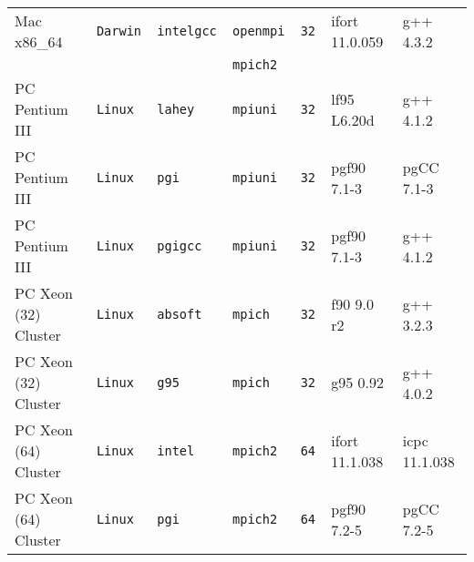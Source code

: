 \begin{tabular}{lllllll}
Mac x86\_64           &\tt Darwin &\tt intelgcc     &\tt openmpi    &\tt 32              & ifort \footnotesize 11.0.059       & g++ \footnotesize 4.3.2         \\
                      &           &                 &\tt mpich2     &                    &                                    &                                 \\
PC Pentium III        &\tt Linux  &\tt lahey        &\tt mpiuni     &\tt 32              & lf95 \footnotesize L6.20d          & g++ \footnotesize 4.1.2         \\
PC Pentium III        &\tt Linux  &\tt pgi          &\tt mpiuni     &\tt 32              & pgf90 \footnotesize 7.1-3          & pgCC \footnotesize 7.1-3        \\
PC Pentium III        &\tt Linux  &\tt pgigcc       &\tt mpiuni     &\tt 32              & pgf90 \footnotesize 7.1-3          & g++ \footnotesize 4.1.2         \\
PC Xeon (32) Cluster  &\tt Linux  &\tt absoft       &\tt mpich      &\tt 32              & f90 \footnotesize 9.0 r2           & g++ \footnotesize 3.2.3         \\
PC Xeon (32) Cluster  &\tt Linux  &\tt g95          &\tt mpich      &\tt 32              & g95 \footnotesize 0.92             & g++  \footnotesize 4.0.2        \\
PC Xeon (64) Cluster  &\tt Linux  &\tt intel        &\tt mpich2     &\tt 64              & ifort \footnotesize 11.1.038       & icpc \footnotesize 11.1.038     \\
PC Xeon (64) Cluster  &\tt Linux  &\tt pgi          &\tt mpich2     &\tt 64              & pgf90 \footnotesize 7.2-5          & pgCC \footnotesize 7.2-5        \\

\end{tabular}
